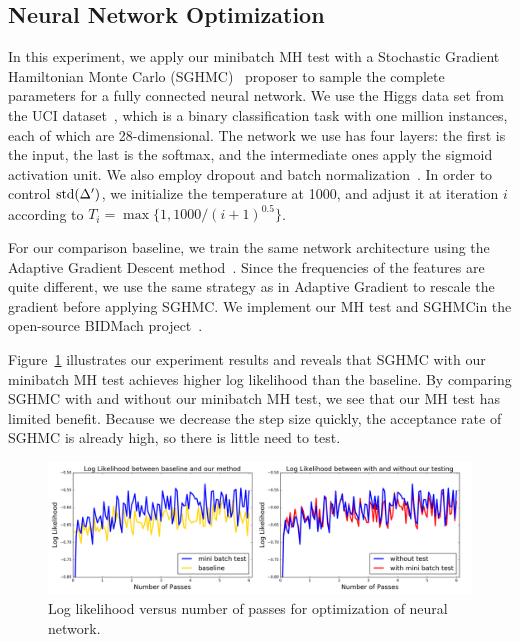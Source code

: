\documentclass{article}
\begin{document}
\subsection{Neural Network Optimization}\label{ssec:nets}

In this experiment, we apply our minibatch MH test with a Stochastic Gradient Hamiltonian
Monte Carlo (SGHMC)~\cite{sghmc_2014} proposer to sample the complete parameters for a fully
connected neural network. We use the Higgs data set from the UCI dataset~\cite{Lichman:2013}, which
is a binary classification task with one million instances, each of which are 28-dimensional. The
network we use has four layers: the first is the input, the last is the softmax, and the
intermediate ones apply the sigmoid activation unit.  We also employ dropout and batch
normalization~\cite{icml2015_ioffe15}.  In order to control ${\rm std}(\Delta')$, we initialize the
temperature at 1000, and adjust it at iteration $i$ according to $T_i = \max\{1,
1000/(i+1)^{0.5}\}$.

For our comparison baseline, we train the same network architecture using the Adaptive Gradient
Descent method~\cite{adapGrad}. Since the frequencies of the features are quite different, we use
the same strategy as in Adaptive Gradient to rescale the gradient before applying SGHMC. We
implement our MH test and SGHMCin the open-source BIDMach project~\cite{canny2013bidmach}.  

Figure~\ref{fig:nnet_fig} illustrates our experiment results and reveals that SGHMC with our
minibatch MH test achieves higher log likelihood than the baseline. By comparing SGHMC with and
without our minibatch MH test, we see that our MH test has limited benefit. Because we decrease the
step size quickly, the acceptance rate of SGHMC is already high, so there is little need to test.

\begin{figure}[t]
    \centering
    \includegraphics[width=1\linewidth]{exp3}
    \caption{Log likelihood versus number of passes for optimization of neural network.}
    \label{fig:nnet_fig}
    \vspace{-10pt}
\end{figure}
\end{document}

